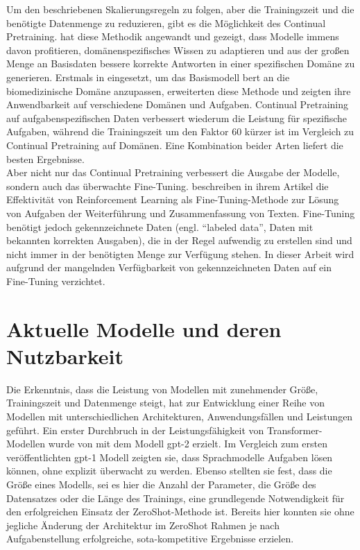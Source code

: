 Um den beschriebenen Skalierungsregeln zu folgen, aber die Trainingszeit und die benötigte Datenmenge zu reduzieren, gibt es die Möglichkeit des Continual Pretraining.
\citet{dont_stop_pretraining} hat diese Methodik angewandt und gezeigt, dass Modelle immens davon profitieren,
domänenspezifisches Wissen zu adaptieren und aus der großen Menge an Basisdaten bessere korrekte Antworten in einer spezifischen Domäne zu generieren.
Erstmals in \citet{biobert} eingesetzt, um das Basismodell \ac{bert} an die biomedizinische Domäne anzupassen,
erweiterten \citet{dont_stop_pretraining} diese Methode und zeigten ihre Anwendbarkeit auf verschiedene Domänen und Aufgaben.
Continual Pretraining auf aufgabenspezifischen Daten verbessert wiederum die Leistung für spezifische Aufgaben,
während die Trainingszeit um den Faktor 60 kürzer ist im Vergleich zu Continual Pretraining auf Domänen.
Eine Kombination beider Arten liefert die besten Ergebnisse.\\

Aber nicht nur das Continual Pretraining verbessert die Ausgabe der Modelle, sondern auch das überwachte Fine-Tuning.
\citet{finetuning} beschreiben in ihrem Artikel die Effektivität von Reinforcement Learning als Fine-Tuning-Methode zur Lösung von Aufgaben der Weiterführung und Zusammenfassung von Texten.
Fine-Tuning benötigt jedoch gekennzeichnete Daten (engl. \enquote{labeled data}, Daten mit bekannten korrekten Ausgaben),
die in der Regel aufwendig zu erstellen sind und nicht immer in der benötigten Menge zur Verfügung stehen.
In dieser Arbeit wird aufgrund der mangelnden Verfügbarkeit von gekennzeichneten Daten auf ein Fine-Tuning verzichtet.\\

\section{Aktuelle Modelle und deren Nutzbarkeit}

Die Erkenntnis, dass die Leistung von Modellen mit zunehmender Größe, Trainingszeit und Datenmenge steigt, hat zur Entwicklung einer Reihe von Modellen mit unterschiedlichen Architekturen, Anwendungsfällen und Leistungen geführt.
Ein erster Durchbruch in der Leistungsfähigkeit von Transformer-Modellen wurde von \citet{gpt2} mit dem Modell \ac{gpt}-2 erzielt.
Im Vergleich zum ersten veröffentlichten \ac{gpt}-1 Modell \citep{gpt1} zeigten sie, dass Sprachmodelle Aufgaben lösen können, ohne explizit überwacht zu werden.
Ebenso stellten sie fest, dass die Größe eines Modells, sei es hier die Anzahl der Parameter,
die Größe des Datensatzes oder die Länge des Trainings, eine grundlegende Notwendigkeit für den erfolgreichen Einsatz der ZeroShot-Methode ist.
Bereits hier konnten sie ohne jegliche Änderung der Architektur im ZeroShot Rahmen je nach Aufgabenstellung erfolgreiche, \ac{sota}-kompetitive Ergebnisse erzielen.\\

